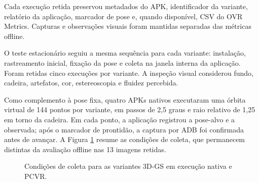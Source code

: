 Cada execução retida preservou metadados do APK, identificador da variante, relatório da aplicação, marcador de pose e, quando disponível, CSV do OVR Metrics. Capturas e observações visuais foram mantidas separadas das métricas offline.

O teste estacionário seguiu a mesma sequência para cada variante: instalação, rastreamento inicial, fixação da pose e coleta na janela interna da aplicação. Foram retidas cinco execuções por variante. A inspeção visual considerou fundo, cadeira, artefatos, cor, estereoscopia e fluidez percebida.

Como complemento à pose fixa, quatro APKs nativos executaram uma órbita virtual de 144 pontos por variante, em passos de 2,5 graus e raio relativo de 1,25 em torno da cadeira. Em cada ponto, a aplicação registrou a pose-alvo e a observada; após o marcador de prontidão, a captura por ADB foi confirmada antes de avançar. A Figura \ref{fig:condicoes_coleta_implementacao} resume as condições de coleta, que permanecem distintas da avaliação offline nas 13 imagens retidas.

\begin{figure}[H]
\centering
\caption{Condições de coleta para as variantes 3D-GS em execução nativa e PCVR.}
\label{fig:condicoes_coleta_implementacao}
\end{figure}

